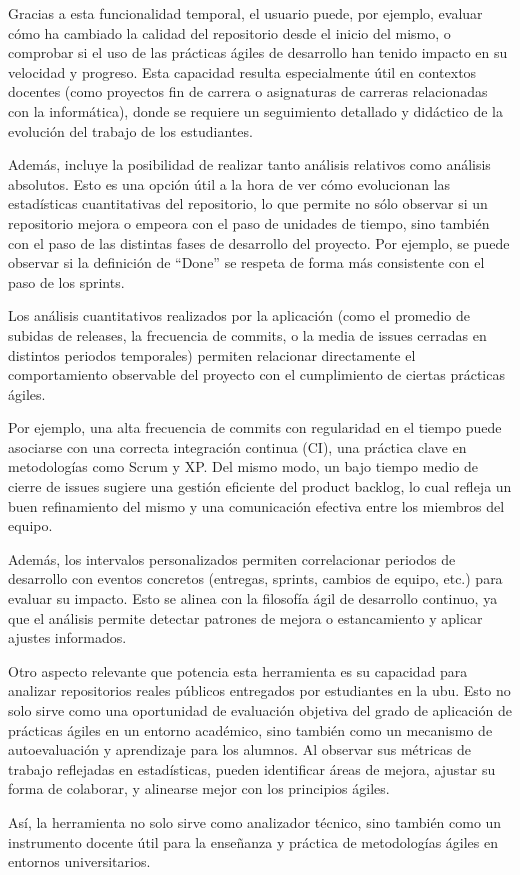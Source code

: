Gracias a esta funcionalidad temporal, el usuario puede, por ejemplo, evaluar cómo ha cambiado la calidad del repositorio desde el inicio del mismo, o comprobar si el uso de las prácticas ágiles de desarrollo han tenido impacto en su velocidad y progreso. Esta capacidad resulta especialmente útil en contextos docentes (como proyectos fin de carrera o asignaturas de carreras relacionadas con la informática), donde se requiere un seguimiento detallado y didáctico de la evolución del trabajo de los estudiantes.

Además, incluye la posibilidad de realizar tanto análisis relativos como análisis absolutos. Esto es una opción útil a la hora de ver cómo evolucionan las estadísticas cuantitativas del repositorio, lo que permite no sólo observar si un repositorio mejora o empeora con el paso de unidades de tiempo, sino también con el paso de las distintas fases de desarrollo del proyecto. Por ejemplo, se puede observar si la definición de ``Done'' se respeta de forma más consistente con el paso de los sprints. 

Los análisis cuantitativos realizados por la aplicación (como el promedio de subidas de releases, la frecuencia de commits, o la media de issues cerradas en distintos periodos temporales) permiten relacionar directamente el comportamiento observable del proyecto con el cumplimiento de ciertas prácticas ágiles.

Por ejemplo, una alta frecuencia de commits con regularidad en el tiempo puede asociarse con una correcta integración continua (CI), una práctica clave en metodologías como Scrum y XP. Del mismo modo, un bajo tiempo medio de cierre de issues sugiere una gestión eficiente del product backlog, lo cual refleja un buen refinamiento del mismo y una comunicación efectiva entre los miembros del equipo.

Además, los intervalos personalizados permiten correlacionar periodos de desarrollo con eventos concretos (entregas, sprints, cambios de equipo, etc.) para evaluar su impacto. Esto se alinea con la filosofía ágil de desarrollo continuo, ya que el análisis permite detectar patrones de mejora o estancamiento y aplicar ajustes informados.

Otro aspecto relevante que potencia esta herramienta es su capacidad para analizar repositorios reales públicos entregados por estudiantes en la \acrfull{ubu}. Esto no solo sirve como una oportunidad de evaluación objetiva del grado de aplicación de prácticas ágiles en un entorno académico, sino también como un mecanismo de autoevaluación y aprendizaje para los alumnos. Al observar sus métricas de trabajo reflejadas en estadísticas, pueden identificar áreas de mejora, ajustar su forma de colaborar, y alinearse mejor con los principios ágiles.

Así, la herramienta no solo sirve como analizador técnico, sino también como un instrumento docente útil para la enseñanza y práctica de metodologías ágiles en entornos universitarios.